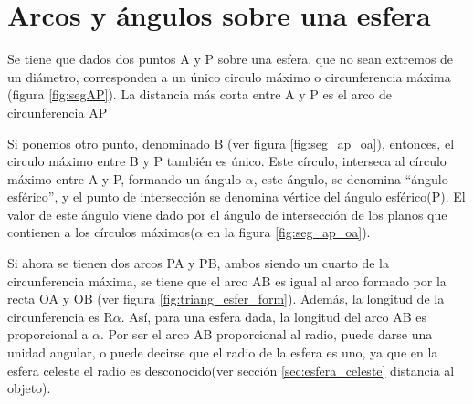 \section{Arcos y ángulos sobre una esfera} 

Se tiene que dados dos puntos A y P sobre una esfera, que no sean extremos de un diámetro, corresponden a un único circulo máximo o circunferencia máxima (figura \ref{fig:segAP}). La distancia más corta entre A y P es el arco de circunferencia AP 

Si ponemos otro punto, denominado B (ver figura \ref{fig:seg_ap_oa}), entonces, el circulo máximo entre B y P también es único. Este círculo, interseca al círculo máximo entre A y P, formando un ángulo $\alpha$, este ángulo, se denomina ``ángulo esférico'', y el punto de intersección se denomina vértice del ángulo esférico(P). El valor de este ángulo viene dado por el ángulo de intersección de los planos que contienen a los círculos máximos($\alpha$ en la figura \ref{fig:seg_ap_oa}).  

Si ahora se tienen dos arcos PA y PB, ambos siendo un cuarto de la circunferencia máxima, se tiene que el arco AB es igual al arco formado por la recta OA y OB (ver figura \ref{fig:triang_esfer_form}). Además, la longitud de la circunferencia es R$\alpha$. Así, para una esfera dada, la longitud del arco AB es proporcional a $\alpha$. Por ser el arco AB proporcional al radio, puede darse una unidad angular, o puede decirse que el radio de la esfera es uno, ya que en la esfera celeste el radio es desconocido(ver sección \ref{sec:esfera_celeste} distancia al objeto).  

